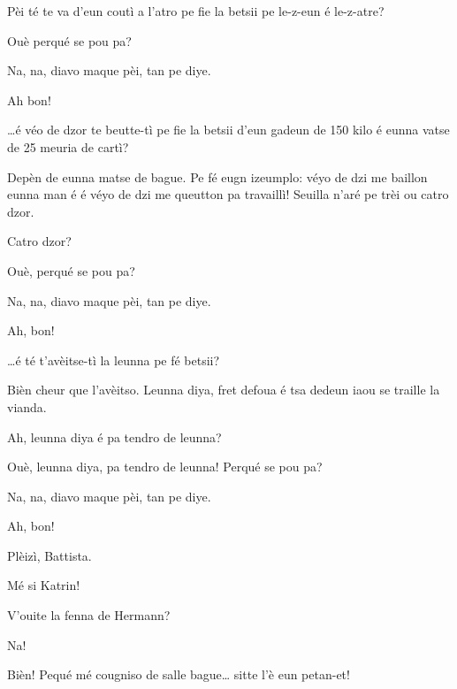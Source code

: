 \begin{drama}

\Battistaspeaks  {}Pèi té te va d’eun coutì a l’atro pe fie la betsii pe le-z-eun é le-z-atre?

\Hermannspeaks {} Ouè perqué se pou pa?

\Battistaspeaks{}  Na, na, diavo maque pèi, tan pe diye.

\Hermannspeaks Ah bon!

\Battistaspeaks  {} \ldots é véo de dzor te beutte-tì pe fie la betsii d’eun gadeun de 150 kilo é eunna vatse de 25 meuria de cartì?

\Hermannspeaks Depèn de eunna matse de bague. Pe fé eugn izeumplo: véyo de dzi me baillon eunna man é  é véyo de dzi me queutton pa travaillì! Seuilla n'aré pe trèi ou catro dzor.

\Battistaspeaks  Catro dzor?

\Hermannspeaks{} Ouè, perqué se pou pa?

\Battistaspeaks{}  Na, na, diavo maque pèi, tan pe diye.

\Hermannspeaks Ah, bon!

\Battistaspeaks{}\ldots é té t’avèitse-tì la leunna pe fé betsii?

\Hermannspeaks Bièn cheur que l’avèitso. Leunna diya, fret defoua é tsa dedeun iaou se traille la vianda. 

\Battistaspeaks Ah, leunna diya é pa tendro de leunna?

\Hermannspeaks {} Ouè, leunna diya, pa tendro de leunna! Perqué se pou pa?

\Battistaspeaks{}  Na, na, diavo maque pèi, tan pe diye.

\Hermannspeaks Ah, bon!


\Battistaspeaks{} Plèizì, Battista.

\Katrinspeaks{} Mé si Katrin!

\Battistaspeaks  V'ouite la fenna de Hermann?

\Katrinspeaks  Na!

\Battistaspeaks  Bièn! Pequé mé cougniso de salle bague\ldots {} sitte l’è eun petan-et!


\end{drama}
